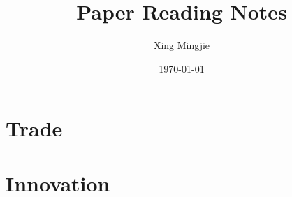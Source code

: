 \usepackage{sectsty}
\allsectionsfont{\rmfamily\bfseries\upshape} %

\usepackage[nottoc,notlof,notlot]{tocbibind} %
\usepackage[titles,subfigure]{tocloft} %
\renewcommand{\cftsecfont}{\rmfamily\mdseries\upshape}
\renewcommand{\cftsecpagefont}{\rmfamily\mdseries\upshape} %

\usepackage[colorlinks,citecolor=black,urlcolor=black,bookmarks=false,hypertexnames=true]{hyperref} 




\title{Paper Reading Notes}
\author{Xing Mingjie}
\date{\today} %


\maketitle

\tableofcontents

\newpage

\section{Trade}
	\subsection{\cite{Fernandesetal2023}}

\section{Innovation}
    \subsection{\cite{Prato2022}}

\newpage
